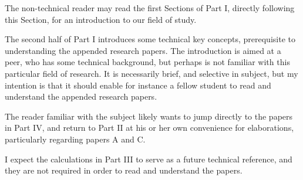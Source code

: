 \documentclass[thesis.tex]{subfiles}
\begin{document}
The non-technical reader may read the first Sections of Part I, directly following this Section, for an introduction to our field of study. 

The second half of Part I introduces some technical key concepts, prerequisite to understanding the appended research papers. The introduction is aimed at a peer, who has some technical background, but perhaps is not familiar with this particular field of research. It is necessarily brief, and selective in subject, but my intention is that it should enable for instance a fellow student to read and understand the appended research papers.

The reader familiar with the subject likely wants to jump directly to the papers in Part IV, and return to Part II at his or her own convenience for elaborations, particularly regarding papers A and C.

I expect the calculations in Part III to serve as a future technical reference, and they are not required in order to read and understand the papers.
\end{document}
